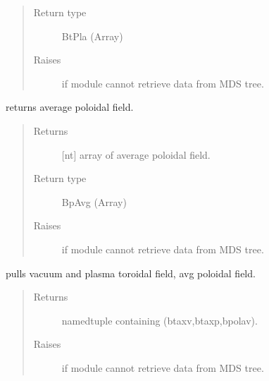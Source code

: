 \documentclass[letterpaper,10pt,english]{sphinxmanual}
\begin{document}
\begin{fulllineitems}
\begin{fulllineitems}
\begin{quote}
\begin{description}
\item[{Return type}] \leavevmode
BtPla (Array)

\item[{Raises}] \leavevmode
{} \textendash{} if module cannot retrieve data from MDS tree.

\end{description}\end{quote}

\end{fulllineitems}


\begin{fulllineitems}
\label{\detokenize{eqtools:eqtools.EFIT.EFITTree.getBpAvg}}
returns average poloidal field.
\begin{quote}\begin{description}
\item[{Returns}] \leavevmode
{[}nt{]} array of average poloidal field.

\item[{Return type}] \leavevmode
BpAvg (Array)

\item[{Raises}] \leavevmode
{} \textendash{} if module cannot retrieve data from MDS tree.

\end{description}\end{quote}

\end{fulllineitems}


\begin{fulllineitems}
\label{\detokenize{eqtools:eqtools.EFIT.EFITTree.getFields}}
pulls vacuum and plasma toroidal field, avg poloidal field.
\begin{quote}\begin{description}
\item[{Returns}] \leavevmode
namedtuple containing (btaxv,btaxp,bpolav).

\item[{Raises}] \leavevmode
{} \textendash{} if module cannot retrieve data from MDS tree.


\end{description}
\end{quote}
\end{fulllineitems}
\end{fulllineitems}
\end{document}
